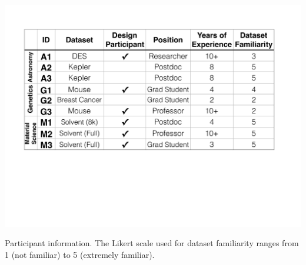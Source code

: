 \begin{table}[h!]
  \centering
  \vspace{-10pt}
  \includegraphics[width=\linewidth]{figures/participant_info.pdf}
  \caption{Participant information. The Likert scale used for dataset familiarity ranges from 1 (not familiar) to 5 (extremely familiar).}
  \label{participants}
  \vspace{-15pt}
\end{table}
